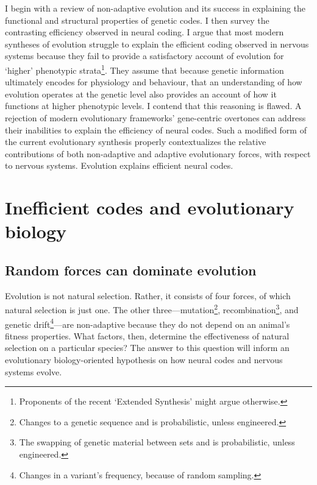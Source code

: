 \documentclass[twocolumn]{article}
\begin{document}
I begin with a review of non-adaptive evolution and its success in explaining the functional and structural properties of genetic codes. I then survey the contrasting efficiency observed in neural coding. I argue that most modern syntheses of evolution \cite{huxley2010evolution, kimura1983neutral} struggle to explain the efficient coding observed in nervous systems because they fail to provide a satisfactory account of evolution for `higher' phenotypic strata\footnote{Proponents of the recent `Extended Synthesis' \cite{pigliucci2010evolution} might argue otherwise.}. They assume that because genetic information ultimately encodes for physiology and behaviour, that an understanding of how evolution operates at the genetic level also provides an account of how it functions at higher phenotypic levels. I contend that this reasoning is flawed. A rejection of modern evolutionary frameworks' gene-centric overtones can address their inabilities to explain the efficiency of neural codes. Such a modified form of the current evolutionary synthesis properly contextualizes the relative contributions of both non-adaptive and adaptive evolutionary forces, with respect to nervous systems. Evolution explains efficient neural codes. 

\section{Inefficient codes and evolutionary biology}


\subsection{Random forces can dominate evolution}

Evolution is not natural selection. Rather, it consists of four forces, of which natural selection is just one. The other three---mutation\footnote{Changes to a genetic sequence and is probabilistic, unless engineered.}, recombination\footnote{The swapping of genetic material between sets and is probabilistic, unless engineered.}, and genetic drift\footnote{Changes in a variant's frequency, because of random sampling.}---are non-adaptive because they do not depend on an animal's fitness properties. What factors, then, determine the effectiveness of natural selection on a particular species? The answer to this question will inform an evolutionary biology-oriented hypothesis on how neural codes and nervous systems evolve.
\end{document}
